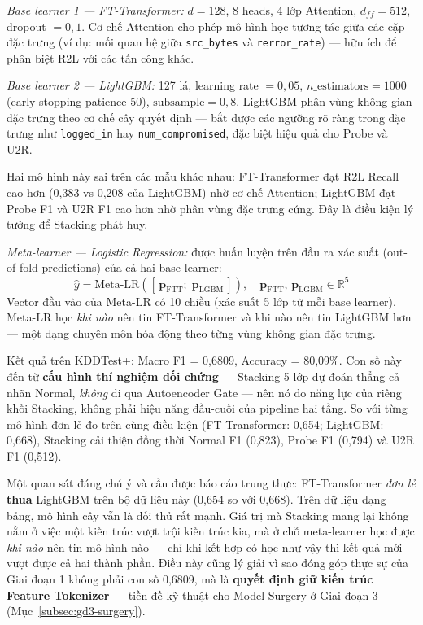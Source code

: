 \documentclass[../DoAn.tex]{subfiles}
\begin{document}
\textit{Base learner 1 --- FT-Transformer:} $d = 128$, 8 heads, 4 lớp Attention, $d_{ff} = 512$, dropout $= 0{,}1$. Cơ chế Attention cho phép mô hình học tương tác giữa các cặp đặc trưng (ví dụ: mối quan hệ giữa \texttt{src\_bytes} và \texttt{rerror\_rate}) --- hữu ích để phân biệt R2L với các tấn công khác.

\textit{Base learner 2 --- LightGBM:} 127 lá, learning rate $= 0{,}05$, $n\_\text{estimators} = 1000$ (early stopping patience 50), $\text{subsample} = 0{,}8$. LightGBM phân vùng không gian đặc trưng theo cơ chế cây quyết định --- bắt được các ngưỡng rõ ràng trong đặc trưng như \texttt{logged\_in} hay \texttt{num\_compromised}, đặc biệt hiệu quả cho Probe và U2R.

Hai mô hình này sai trên các mẫu khác nhau: FT-Transformer đạt R2L Recall cao hơn (0,383 vs 0,208 của LightGBM) nhờ cơ chế Attention; LightGBM đạt Probe F1 và U2R F1 cao hơn nhờ phân vùng đặc trưng cứng. Đây là điều kiện lý tưởng để Stacking phát huy.

\textit{Meta-learner --- Logistic Regression:} được huấn luyện trên đầu ra xác suất (out-of-fold predictions) của cả hai base learner:
\begin{equation}
    \hat{y} = \text{Meta-LR}\!\left([\,\mathbf{p}_\text{FTT};\;\mathbf{p}_\text{LGBM}\,]\right), \quad
    \mathbf{p}_\text{FTT},\,\mathbf{p}_\text{LGBM} \in \mathbb{R}^5
    \label{eq:stacking}
\end{equation}
Vector đầu vào của Meta-LR có 10 chiều (xác suất 5 lớp từ mỗi base learner). Meta-LR học \textit{khi nào} nên tin FT-Transformer và khi nào nên tin LightGBM hơn --- một dạng chuyên môn hóa động theo từng vùng không gian đặc trưng.

Kết quả trên KDDTest+: Macro F1 = 0,6809, Accuracy = 80,09\%. Con số này đến từ \textbf{cấu hình thí nghiệm đối chứng} --- Stacking 5 lớp dự đoán thẳng cả nhãn Normal, \textit{không} đi qua Autoencoder Gate --- nên nó đo năng lực của riêng khối Stacking, không phải hiệu năng đầu-cuối của pipeline hai tầng. So với từng mô hình đơn lẻ đo trên cùng điều kiện (FT-Transformer: 0,654; LightGBM: 0,668), Stacking cải thiện đồng thời Normal F1 (0,823), Probe F1 (0,794) và U2R F1 (0,512).

Một quan sát đáng chú ý và cần được báo cáo trung thực: FT-Transformer \textit{đơn lẻ} \textbf{thua} LightGBM trên bộ dữ liệu này (0,654 so với 0,668). Trên dữ liệu dạng bảng, mô hình cây vẫn là đối thủ rất mạnh. Giá trị mà Stacking mang lại không nằm ở việc một kiến trúc vượt trội kiến trúc kia, mà ở chỗ meta-learner học được \textit{khi nào} nên tin mô hình nào --- chỉ khi kết hợp có học như vậy thì kết quả mới vượt được cả hai thành phần. Điều này cũng lý giải vì sao đóng góp thực sự của Giai đoạn 1 không phải con số 0,6809, mà là \textbf{quyết định giữ kiến trúc Feature Tokenizer} --- tiền đề kỹ thuật cho Model Surgery ở Giai đoạn 3 (Mục~\ref{subsec:gd3-surgery}).
\end{document}
